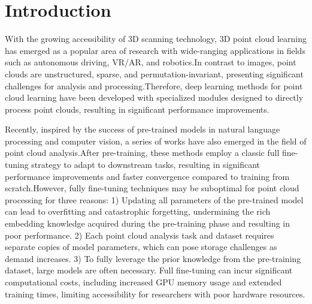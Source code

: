 \section{Introduction}
\label{sec:intro}

With the growing accessibility of 3D scanning technology, 3D point cloud learning has emerged as a popular area of research with wide-ranging applications in fields such as autonomous driving, VR/AR, and robotics.In contrast to images, point clouds are unstructured, sparse, and permutation-invariant, presenting significant challenges for analysis and processing.Therefore, deep learning methods\cite{qi2017pointnet, li2018pointcnn,qian2022pointnext,qi2017pointnet++,wang2019dynamic,wu2024point,wu2022point,zhang2022patchformer,park2022fast,zhao2021point,guo2021pct,ma2022rethinking} for point cloud learning have been developed with specialized modules designed to directly process point clouds, resulting in significant performance improvements.



Recently, inspired by the success of pre-trained models in natural language processing\cite{devlin2018bert,brown2020language,2020ALBERT,raffel2020exploring,touvron2023llama,team2024gemma} and computer vision\cite{he2020momentum,chen2020improved,chen2021empirical,he2022masked,xie2022simmim,yeh2022decoupled}, a series of works\cite{pang2022masked,yu2022point,zhang2022point,afham2022crosspoint,dong2022autoencoders,liu2022masked,xie2020pointcontrast,qi2023contrast,wang2021unsupervised} have also emerged in the field of point cloud analysis.After pre-training, these methods employ a classic full fine-tuning strategy to adapt to downstream tasks, resulting in significant performance improvements and faster convergence compared to training from scratch.However, fully fine-tuning techniques may be suboptimal for point cloud processing for three reasons: 1) Updating all parameters of the pre-trained model can lead to overfitting and catastrophic forgetting, undermining the rich embedding knowledge acquired during the pre-training phase and resulting in poor performance. 2) Each point cloud analysis task and dataset requires separate copies of model parameters, which can pose storage challenges as demand increases. 3) To fully leverage the prior knowledge from the pre-training dataset, large models are often necessary. Full fine-tuning can incur significant computational costs, including increased GPU memory usage and extended training times, limiting accessibility for researchers with poor hardware resources.

